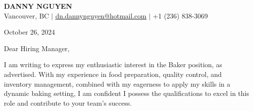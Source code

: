 \documentclass[letterpaper,11pt]{article}
\begin{document}
\begin{center}
\textbf{\Huge \scshape DANNY NGUYEN} \\ \vspace{1pt}
\small Vancouver, BC $|$ \href{mailto:dn.dannynguyen@hotmail.com}{\underline{dn.dannynguyen@hotmail.com}} $|$ +1 (236) 838-3069
\end{center}

\vspace{20pt}
October 26, 2024

\vspace{20pt}

\vspace{10pt}
Dear Hiring Manager,

\vspace{10pt}
I am writing to express my enthusiastic interest in the Baker position, as advertised. With my experience in food preparation, quality control, and inventory management, combined with my eagerness to apply my skills in a dynamic baking setting, I am confident I possess the qualifications to excel in this role and contribute to your team's success.
\end{document}
